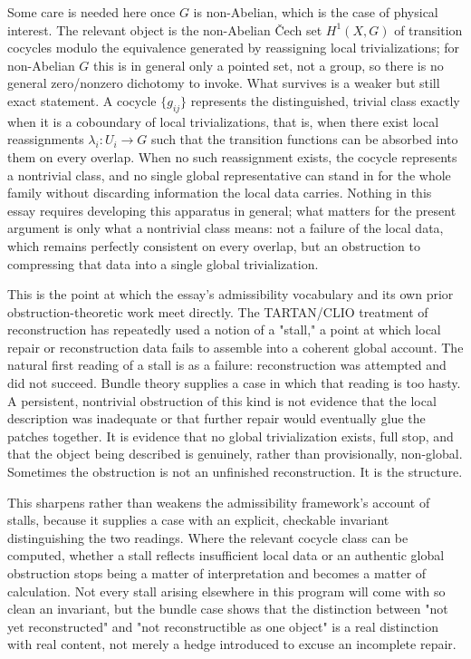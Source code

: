 \documentclass[11pt]{article}
\begin{document}
Some care is needed here once $G$ is non-Abelian, which is the case of physical interest. The relevant object is the non-Abelian \v{C}ech set $H^1(X,G)$ of transition cocycles modulo the equivalence generated by reassigning local trivializations; for non-Abelian $G$ this is in general only a pointed set, not a group, so there is no general zero/nonzero dichotomy to invoke. What survives is a weaker but still exact statement. A cocycle $\{g_{ij}\}$ represents the distinguished, trivial class exactly when it is a coboundary of local trivializations, that is, when there exist local reassignments $\lambda_i : U_i \rightarrow G$ such that the transition functions can be absorbed into them on every overlap. When no such reassignment exists, the cocycle represents a nontrivial class, and no single global representative can stand in for the whole family without discarding information the local data carries. Nothing in this essay requires developing this apparatus in general; what matters for the present argument is only what a nontrivial class means: not a failure of the local data, which remains perfectly consistent on every overlap, but an obstruction to compressing that data into a single global trivialization.

This is the point at which the essay's admissibility vocabulary and its own prior obstruction-theoretic work meet directly. The TARTAN/CLIO treatment of reconstruction has repeatedly used a notion of a "stall," a point at which local repair or reconstruction data fails to assemble into a coherent global account. The natural first reading of a stall is as a failure: reconstruction was attempted and did not succeed. Bundle theory supplies a case in which that reading is too hasty. A persistent, nontrivial obstruction of this kind is not evidence that the local description was inadequate or that further repair would eventually glue the patches together. It is evidence that no global trivialization exists, full stop, and that the object being described is genuinely, rather than provisionally, non-global. Sometimes the obstruction is not an unfinished reconstruction. It is the structure.

This sharpens rather than weakens the admissibility framework's account of stalls, because it supplies a case with an explicit, checkable invariant distinguishing the two readings. Where the relevant cocycle class can be computed, whether a stall reflects insufficient local data or an authentic global obstruction stops being a matter of interpretation and becomes a matter of calculation. Not every stall arising elsewhere in this program will come with so clean an invariant, but the bundle case shows that the distinction between "not yet reconstructed" and "not reconstructible as one object" is a real distinction with real content, not merely a hedge introduced to excuse an incomplete repair.
\end{document}
